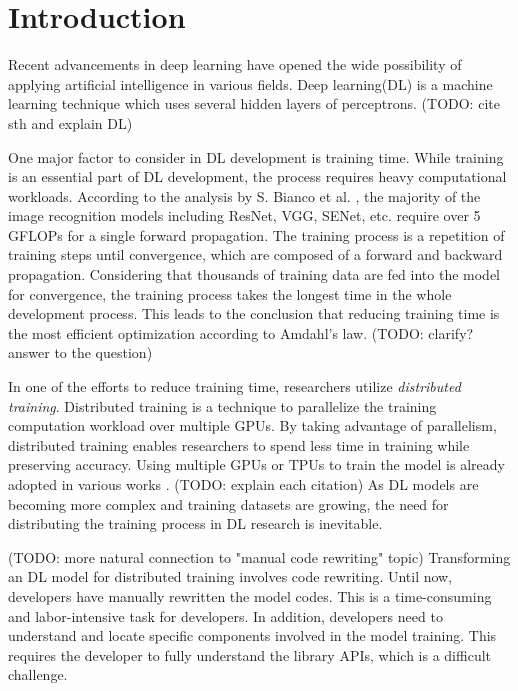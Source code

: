 \section{Introduction}\label{sec:intro}

Recent advancements in deep learning have opened the wide possibility of
applying artificial intelligence in various fields.
Deep learning(DL) is a machine learning technique which uses
several hidden layers of perceptrons. (TODO: cite sth and explain DL)

One major factor to consider in DL development is training time.
While training is an essential part of DL development,
the process requires heavy computational workloads.
According to the analysis by S. Bianco et al. \cite{bianco2018benchmark},
the majority of the image recognition models including ResNet, VGG, SENet, etc.
require over 5 GFLOPs for a single forward propagation.
The training process is a repetition of training steps until convergence,
which are composed of a forward and backward propagation.
Considering that thousands of training data are fed into the model
for convergence, the training process takes the longest time
in the whole development process. This leads to the conclusion that
reducing training time is the most efficient optimization according to
Amdahl's law.
(TODO: clarify? answer to the question)

In one of the efforts to reduce training time, 
researchers utilize \textit{distributed training}.
Distributed training is a technique to parallelize the training computation
workload over multiple GPUs.
By taking advantage of parallelism, distributed training enables researchers
to spend less time in training while preserving accuracy.
Using multiple GPUs or TPUs to train the model is already adopted
in various works \cite{brown2020gpt-3} \cite{silver2017alphazero}
\cite{zhang2019distrspeech} \cite{tian2020distrwebattack}.
(TODO: explain each citation)
As DL models are becoming more complex and training datasets are growing,
the need for distributing the training process in DL research is inevitable.

(TODO: more natural connection to "manual code rewriting" topic)
Transforming an DL model for distributed training involves code rewriting.
Until now, developers have manually rewritten the model codes.
This is a time-consuming and labor-intensive task for developers.
In addition, developers need to understand and locate 
specific components involved in the model training.
This requires the developer to fully understand the library APIs,
which is a difficult challenge.

